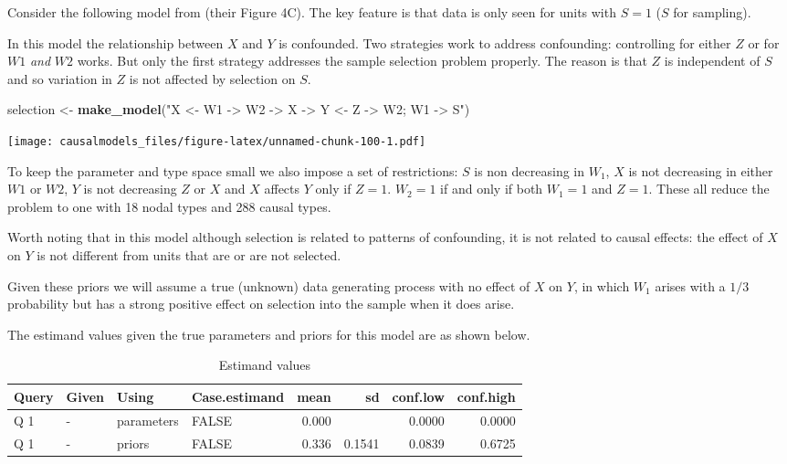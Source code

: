 \documentclass[
  12pt,
]{book}
\newenvironment{Shaded}{\begin{snugshade}}{\end{snugshade}}
\newcommand{\FunctionTok}[1]{\textcolor[rgb]{0.13,0.29,0.53}{\textbf{#1}}}
\newcommand{\NormalTok}[1]{#1}
\newcommand{\OtherTok}[1]{\textcolor[rgb]{0.56,0.35,0.01}{#1}}
\newcommand{\StringTok}[1]{\textcolor[rgb]{0.31,0.60,0.02}{#1}}
\begin{document}
Consider the following model from \citet{bareinboim2016causal} (their Figure 4C). The key feature is that data is only seen for units with \(S=1\) (\(S\) for sampling).

In this model the relationship between \(X\) and \(Y\) is confounded. Two strategies work to address confounding: controlling for either \(Z\) or for \(W1\) \emph{and} \(W2\) works. But only the first strategy addresses the sample selection problem properly. The reason is that \(Z\) is independent of \(S\) and so variation in \(Z\) is not affected by selection on \(S\).

\begin{Shaded}
\begin{Highlighting}[]
\NormalTok{selection }\OtherTok{\textless{}{-}} \FunctionTok{make\_model}\NormalTok{(}\StringTok{"X \textless{}{-} W1 {-}\textgreater{} W2 {-}\textgreater{} X {-}\textgreater{} Y \textless{}{-} Z {-}\textgreater{} W2; W1 {-}\textgreater{} S"}\NormalTok{)}
\end{Highlighting}
\end{Shaded}

\texttt{[image: causalmodels\_files/figure-latex/unnamed-chunk-100-1.pdf]}

To keep the parameter and type space small we also impose a set of restrictions: \(S\) is non decreasing in \(W_1\), \(X\) is not decreasing in either \(W1\) or \(W2\), \(Y\) is not decreasing \(Z\) or \(X\) and \(X\) affects \(Y\) only if \(Z=1\). \(W_2=1\) if and only if both \(W_1=1\) and \(Z=1\). These all reduce the problem to one with 18 nodal types and 288 causal types.

Worth noting that in this model although selection is related to patterns of confounding, it is not related to causal effects: the effect of \(X\) on \(Y\) is not different from units that are or are not selected.

Given these priors we will assume a true (unknown) data generating process with no effect of \(X\) on \(Y\), in which \(W_1\) arises with a \(1/3\) probability but has a strong positive effect on selection into the sample when it does arise.

The estimand values given the true parameters and priors for this model are as shown below.

\begin{table}

\caption{\label{tab:appsimpleselcconf5}Estimand values}
\centering
\begin{tabular}[t]{l|l|l|l|r|r|r|r}
\hline
Query & Given & Using & Case.estimand & mean & sd & conf.low & conf.high\\
\hline
Q 1 & - & parameters & FALSE & 0.000 &  & 0.0000 & 0.0000\\
\hline
Q 1 & - & priors & FALSE & 0.336 & 0.1541 & 0.0839 & 0.6725\\
\hline
\end{tabular}
\end{table}
\end{document}
